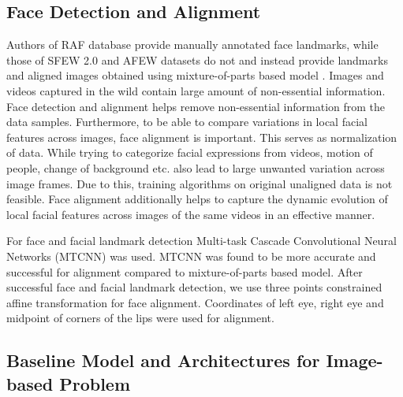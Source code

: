\documentclass[10pt,twocolumn,letterpaper]{article}
\begin{document}
	\subsection{Face Detection and Alignment}
	Authors of RAF database \cite{dlpcnn} provide manually annotated face landmarks, while those of SFEW 2.0 \cite{sfew} and AFEW \cite{afew} datasets do not and instead provide landmarks and aligned images obtained using mixture-of-parts based model \cite{zhuandramanan}.
	Images and videos captured in the wild contain large amount of non-essential information. Face detection and alignment helps remove non-essential information from the data samples. Furthermore, to be able to compare variations in local facial features across images, face alignment is important. This serves as normalization of data. While trying to categorize facial expressions from videos, motion of people, change of background etc. also lead to large unwanted variation across image frames. Due to this, training algorithms on original unaligned data is not feasible. Face alignment additionally helps to capture the dynamic evolution of local facial features across images of the same videos in an effective manner.
	
	For face and facial landmark detection Multi-task Cascade Convolutional Neural Networks (MTCNN) \cite{mtcnn} was used. MTCNN was found to be more accurate and successful for alignment compared to mixture-of-parts based model. After successful face and facial landmark detection, we use three points constrained affine transformation for face alignment. Coordinates of left eye, right eye and midpoint of corners of the lips were used for alignment.

	
	\subsection{Baseline Model and Architectures for Image-based Problem}
\end{document}

